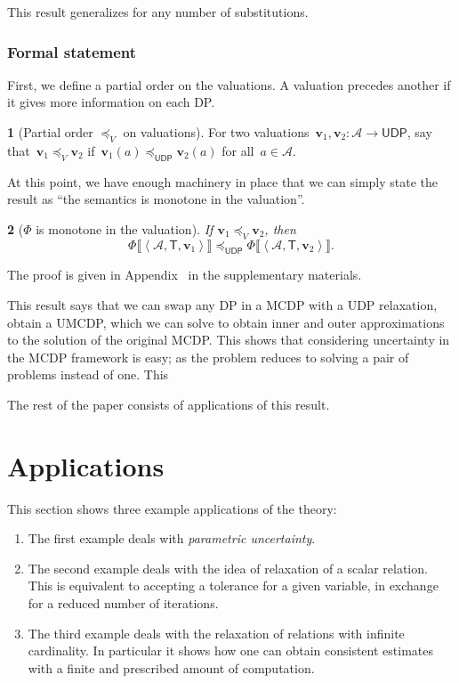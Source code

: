 \documentclass[twocolumn,english]{IEEEconf}
\theoremstyle{plain}
\newtheorem{thm}{\protect\theoremname}
\theoremstyle{definition}
\theoremstyle{definition}
\newtheorem{defn}[thm]{\protect\definitionname}
\theoremstyle{plain}
\newcommand{\aword}[1]{\mathsf{#1}}
\newcommand{\vmath}[1]{\aword{#1}}
\newcommand{\posleq}{\preceq}
\newcommand{\udpsp}{\vmath{UDP}}
\newcommand{\udpleq}{\posleq_\udpsp}
\newcommand{\udpsem}{\Phi}
\newcommand{\atoms}{\mathcal{A}}
\newcommand{\atree}{\boldsymbol{\vmath{T}}}
\newcommand{\val}{\boldsymbol{v}}
\providecommand{\definitionname}{Definition}
\providecommand{\theoremname}{Theorem}
\begin{document}
This result generalizes for any number of substitutions.

\subsubsection*{Formal statement}

First, we define a partial order on the valuations. A valuation precedes
another if it gives more information on each DP.
\begin{defn}[Partial order $\posleq_{V}$ on valuations]
\label{def:For-two-valuations,}For two valuations~$\val_{1},\val_{2}:\atoms\rightarrow\udpsp$,
say that~$\val_{1}\posleq_{V}\val_{2}$ if~$\val_{1}(a)\udpleq\val_{2}(a)$
for all~$a\in\atoms$.
\end{defn}
At this point, we have enough machinery in place that we can simply
state the result as ``the semantics is monotone in the valuation''.
\begin{thm}[$\udpsem$ is monotone in the valuation]
\label{thm:udpsem-monotone}If $\val_{1}\posleq_{V}\val_{2}$, then
\[
\udpsem\llbracket\left\langle \atoms,\atree,\val_{1}\right\rangle \rrbracket\udpleq\udpsem\llbracket\left\langle \atoms,\atree,\val_{2}\right\rangle \rrbracket.
\]
\end{thm}
The proof is given in Appendix~
in the supplementary materials.

This result says that we can swap any DP in a MCDP with a UDP relaxation,
obtain a UMCDP, which we can solve to obtain inner and outer approximations
to the solution of the original MCDP. This shows that considering
uncertainty in the MCDP framework is easy; as the problem reduces
to solving a pair of problems instead of one. This

The rest of the paper consists of applications of this result.

\section{Applications\label{sec:Applications}}

This section shows three example applications of the theory:
\begin{enumerate}
\item The first example deals with \emph{parametric uncertainty}.
\item The second example deals with the idea of relaxation of a scalar relation.
This is equivalent to accepting a tolerance for a given variable,
in exchange for a reduced number of iterations.
\item The third example deals with the relaxation of relations with infinite
cardinality. In particular it shows how one can obtain consistent
estimates with a finite and prescribed amount of computation.
\end{enumerate}
\end{document}

